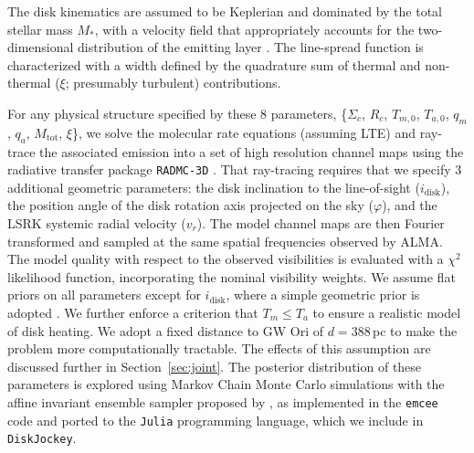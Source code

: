 \documentclass[twocolumn]{aastex61}
\begin{document}
The disk kinematics are assumed to be Keplerian and dominated by the total stellar mass $M_{\ast}$, with a velocity field that appropriately accounts for the two-dimensional distribution of the emitting layer \citep[see][]{rosenfeld13a}.  The  line-spread function is characterized with a width defined by the quadrature sum of thermal and non-thermal ($\xi$; presumably turbulent) contributions.

For any physical structure specified by these 8 parameters, \{$\Sigma_c$, $R_c$, $T_{m,0}$, $T_{a,0}$, $q_m$, $q_a$, $M_\mathrm{tot}$, $\xi$\}, we solve the molecular rate equations (assuming LTE) and ray-trace the associated emission into a set of high resolution channel maps using the radiative transfer package {\tt RADMC-3D} \citep{dullemond12}.  That ray-tracing requires that we specify 3 additional geometric parameters: the disk inclination to the line-of-sight ($i_\mathrm{disk}$), the position angle of the disk rotation axis projected on the sky ($\varphi$), and the LSRK systemic radial velocity ($v_r$).  The model channel maps are then Fourier transformed and sampled at the same spatial frequencies observed by ALMA.  The model quality with respect to the observed visibilities is evaluated with a $\chi^2$ likelihood function, incorporating the nominal visibility weights.
We assume flat priors on all parameters except for $i_\mathrm{disk}$, where a simple geometric prior is adopted \citep{czekala16}.  We further enforce a criterion that $T_m \leq T_a$ to ensure a realistic model of disk heating. We adopt a fixed distance to GW Ori of $d = 388\,$pc \citep{kounkel17} to make the problem more computationally tractable.  The effects of this assumption are discussed further in Section~\ref{sec:joint}. The posterior distribution of these parameters is explored using Markov Chain Monte Carlo simulations with the affine invariant ensemble sampler proposed by \citet{goodman10}, as implemented in the {\tt emcee} code \citep{foreman-mackey13} and ported to the {\tt Julia} programming language, which we include in {\tt DiskJockey}.
\end{document}
